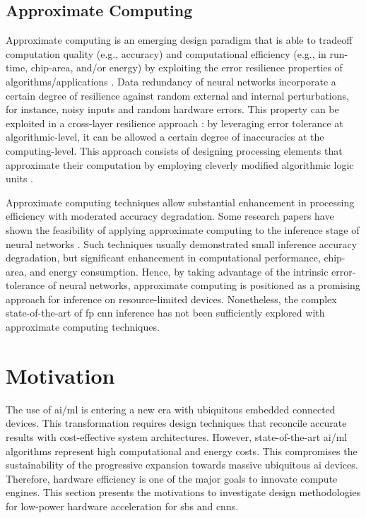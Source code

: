 \subsection{Approximate Computing}
Approximate computing is an emerging design paradigm that is able to tradeoff computation quality (e.g., accuracy) and computational efficiency (e.g., in run-time, chip-area, and/or energy) by exploiting the error resilience properties of algorithms/applications \cite{gillani2020exploiting, zhang2015approxann}. Data redundancy of neural networks incorporate a certain degree of resilience against random external and internal perturbations, for instance, noisy inputs and random hardware errors. This property can be exploited in a cross-layer resilience approach \cite{carter2010design}: by leveraging error tolerance at algorithmic-level, it can be allowed a certain degree of inaccuracies at the computing-level. This approach consists of designing processing elements that approximate their computation by employing cleverly modified algorithmic logic units \cite{han2013approximate}.

Approximate computing techniques allow substantial enhancement in processing efficiency with moderated accuracy degradation. Some research papers have shown the feasibility of applying approximate computing to the inference stage of neural networks \cite{lotrivc2012applicability, han2013approximate, du2014leveraging, mrazek2016design, sarwar2016multiplier, zervakis2021approximate}. Such techniques usually demonstrated small inference accuracy degradation, but significant enhancement in computational performance, chip-area, and energy consumption. Hence, by taking advantage of the intrinsic error-tolerance of neural networks, approximate computing is positioned as a promising approach for inference on resource-limited devices. Nonetheless, the complex state-of-the-art of \gls{fp} \gls{cnn} inference has not been sufficiently explored with approximate computing techniques.

\section{Motivation}\label{chap1.motivation}
The use of \gls{ai}/\gls{ml} is entering a new era with ubiquitous embedded connected devices. This transformation requires design techniques that reconcile accurate results with cost-effective system architectures. However, state-of-the-art \gls{ai}/\gls{ml} algorithms represent high computational and energy costs. This compromises the sustainability of the progressive expansion towards massive ubiquitous \gls{ai} devices. Therefore, hardware efficiency is one of the major goals to innovate compute engines. This section presents the motivations to investigate design methodologies for low-power hardware acceleration for \gls{sbs} and \glspl{cnn}.


